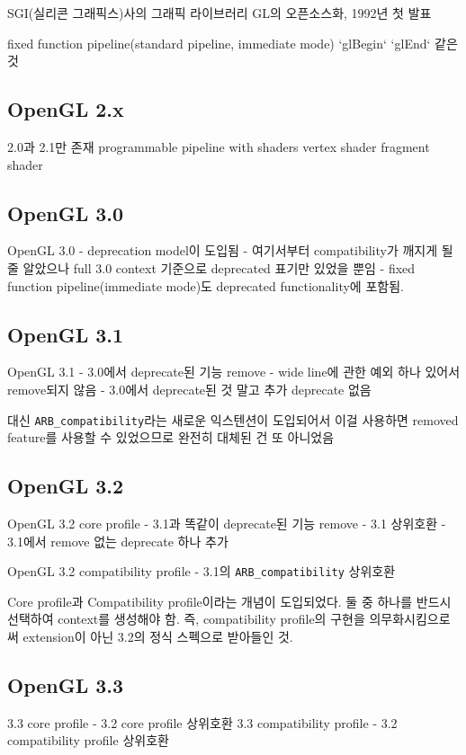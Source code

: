 \documentclass[a4paper]{report}
\begin{document}
SGI(실리콘 그래픽스)사의 그래픽 라이브러리 GL의 오픈소스화, 1992년 첫 발표

fixed function pipeline(standard pipeline, immediate mode)
`glBegin` `glEnd` 같은 것

\subsection{OpenGL 2.x}
2.0과 2.1만 존재
programmable pipeline with shaders
vertex shader
fragment shader

\subsection{OpenGL 3.0}
OpenGL 3.0
- deprecation model이 도입됨
- 여기서부터 compatibility가 깨지게 될 줄 알았으나 full 3.0 context 기준으로 deprecated 표기만 있었을 뿐임
- fixed function pipeline(immediate mode)도 deprecated functionality에 포함됨.


\subsection{OpenGL 3.1}
OpenGL 3.1
- 3.0에서 deprecate된 기능 remove
- wide line에 관한 예외 하나 있어서 remove되지 않음
- 3.0에서 deprecate된 것 말고 추가 deprecate 없음

대신 \verb|ARB_compatibility|라는 새로운 익스텐션이 도입되어서 이걸 사용하면 removed feature를 사용할 수 있었으므로 완전히 대체된 건 또 아니었음



\subsection{OpenGL 3.2}
OpenGL 3.2 core profile
- 3.1과 똑같이 deprecate된 기능 remove
- 3.1 상위호환
- 3.1에서 remove 없는 deprecate 하나 추가

OpenGL 3.2 compatibility profile
- 3.1의 \verb|ARB_compatibility| 상위호환

Core profile과 Compatibility profile이라는 개념이 도입되었다. 둘 중 하나를 반드시 선택하여 context를 생성해야 함. 즉, compatibility profile의 구현을 의무화시킴으로써 extension이 아닌 3.2의 정식 스펙으로 받아들인 것.




\subsection{OpenGL 3.3}
3.3 core profile
- 3.2 core profile 상위호환
3.3 compatibility profile
- 3.2 compatibility profile 상위호환
\end{document}
